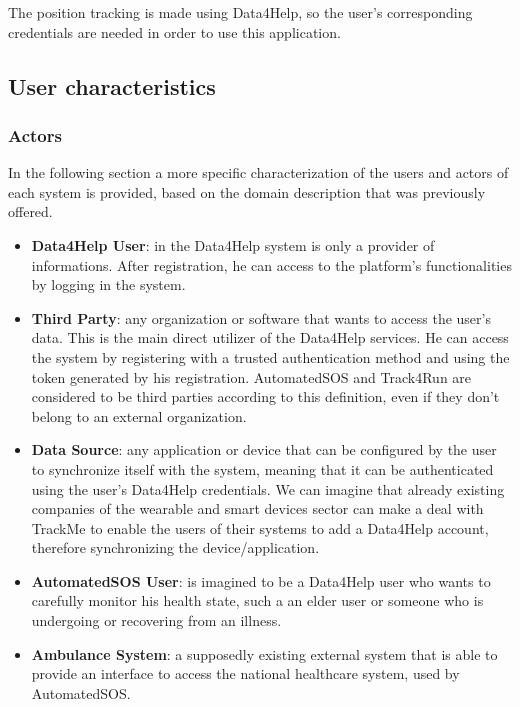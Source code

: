 The position tracking is made using Data4Help, so the user's corresponding credentials are needed in order to use this application.

\subsection{User characteristics}

\subsubsection{Actors}
In the following section a more specific characterization of the users and actors of each system is provided, based on the domain description that was previously offered.

\begin{itemize}
\item \textbf{Data4Help User}: in the Data4Help system is only a provider of informations. After registration, he can access to the platform's functionalities by logging in the system.
 
\item \textbf{Third Party}: any organization or software that wants to access the user's data. This is the main direct utilizer of the Data4Help services. He can access the system by registering with a trusted authentication method and using the token generated by his registration. 
AutomatedSOS and Track4Run are considered to be third parties according to this definition, even if they don't belong to an external organization.

\item \textbf{Data Source}: any application or device that can be configured by the user to synchronize itself with the system, meaning that it can be authenticated using the user's Data4Help credentials.
We can imagine that already existing companies of the wearable and smart devices sector can make a deal with TrackMe to enable the users of their systems to add a Data4Help account, therefore synchronizing the device/application. 

\item \textbf{AutomatedSOS User}: is imagined to be a Data4Help user who wants to carefully monitor his health state, such a an elder user or someone who is undergoing or recovering from an illness.

\item \textbf{Ambulance System}: a supposedly existing external system that is able to provide an interface to access the national healthcare system, used by AutomatedSOS.


\end{itemize}
